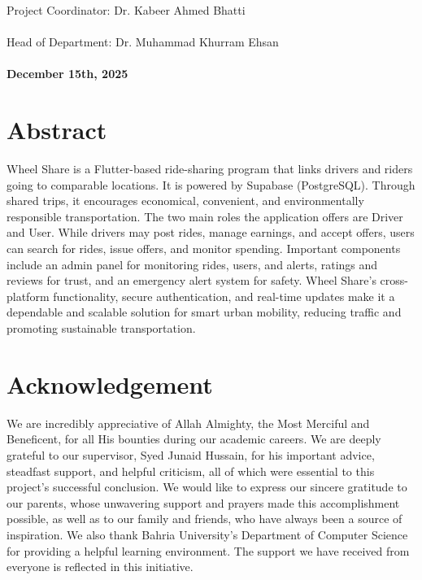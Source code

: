 \documentclass[12pt]{report}
\begin{document}
Project Coordinator: Dr. Kabeer Ahmed Bhatti\\
\noindent\makebox[\textwidth]{\hrulefill}\\[0.2cm]

Head of Department: Dr. Muhammad Khurram Ehsan\\
\noindent\makebox[\textwidth]{\hrulefill}\\[0.2cm]

\textbf{December 15th, 2025}

\clearpage

\chapter*{Abstract}

Wheel Share is a Flutter-based ride-sharing program that links drivers and riders going to comparable locations. It is powered by Supabase (PostgreSQL). Through shared trips, it encourages economical, convenient, and environmentally responsible transportation. The two main roles the application offers are Driver and User. While drivers may post rides, manage earnings, and accept offers, users can search for rides, issue offers, and monitor spending. Important components include an admin panel for monitoring rides, users, and alerts, ratings and reviews for trust, and an emergency alert system for safety. Wheel Share’s cross-platform functionality, secure authentication, and real-time updates make it a dependable and scalable solution for smart urban mobility, reducing traffic and promoting sustainable transportation.

\chapter*{Acknowledgement}

We are incredibly appreciative of Allah Almighty, the Most Merciful and Beneficent, for all His bounties during our academic careers. We are deeply grateful to our supervisor, Syed Junaid Hussain, for his important advice, steadfast support, and helpful criticism, all of which were essential to this project's successful conclusion. We would like to express our sincere gratitude to our parents, whose unwavering support and prayers made this accomplishment possible, as well as to our family and friends, who have always been a source of inspiration. We also thank Bahria University’s Department of Computer Science for providing a helpful learning environment. The support we have received from everyone is reflected in this initiative.
\end{document}
